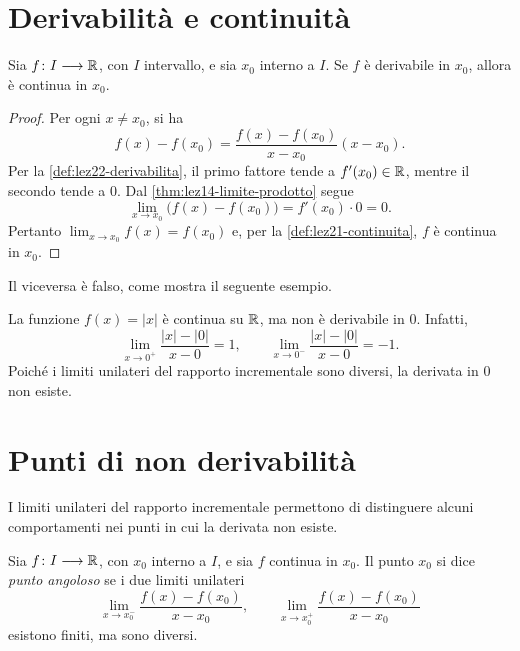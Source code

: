 \section{Derivabilità e continuità}
\label{sec:lez22-derivabilita-continuita}

\begin{theorem}
\label{thm:lez22-derivabilita-continuita}
Sia \(f\colon I\longrightarrow\mathbb{R}\), con \(I\)
intervallo, e sia \(x_0\) interno a \(I\).
Se \(f\) è derivabile in \(x_0\), allora è continua
in \(x_0\).
\end{theorem}

\begin{proof}
Per ogni \(x\ne x_0\), si ha
\[
  f(x)-f(x_0)
  =\frac{f(x)-f(x_0)}{x-x_0}(x-x_0).
\]
Per la \cref{def:lez22-derivabilita}, il primo fattore
tende a \(f'(x_0)\in\mathbb{R}\), mentre il secondo tende
a \(0\). Dal \cref{thm:lez14-limite-prodotto} segue
\[
  \lim_{x\to x_0}\bigl(f(x)-f(x_0)\bigr)
  =f'(x_0)\cdot0=0.
\]
Pertanto \(\lim_{x\to x_0}f(x)=f(x_0)\) e, per
la \cref{def:lez21-continuita}, \(f\) è continua
in \(x_0\).
\end{proof}

Il viceversa è falso, come mostra il seguente esempio.

\begin{example}
\label{ex:lez22-valore-assoluto}
La funzione \(f(x)=|x|\) è continua su \(\mathbb{R}\),
ma non è derivabile in \(0\). Infatti,
\[
  \lim_{x\to0^+}\frac{|x|-|0|}{x-0}=1,
  \qquad
  \lim_{x\to0^-}\frac{|x|-|0|}{x-0}=-1.
\]
Poiché i limiti unilateri del rapporto incrementale
sono diversi, la derivata in \(0\) non esiste.
\end{example}

\section{Punti di non derivabilità}
\label{sec:lez22-punti-non-derivabilita}

I limiti unilateri del rapporto incrementale
permettono di distinguere alcuni comportamenti
nei punti in cui la derivata non esiste.

\begin{definition}
\label{def:lez22-punto-angoloso}
Sia \(f\colon I\longrightarrow\mathbb{R}\), con \(x_0\)
interno a \(I\), e sia \(f\) continua in \(x_0\). Il punto \(x_0\) si dice
\emph{punto angoloso} se i due limiti unilateri
\[
  \lim_{x\to x_0^-}\frac{f(x)-f(x_0)}{x-x_0},
  \qquad
  \lim_{x\to x_0^+}\frac{f(x)-f(x_0)}{x-x_0}
\]
esistono finiti, ma sono diversi.
\end{definition}

